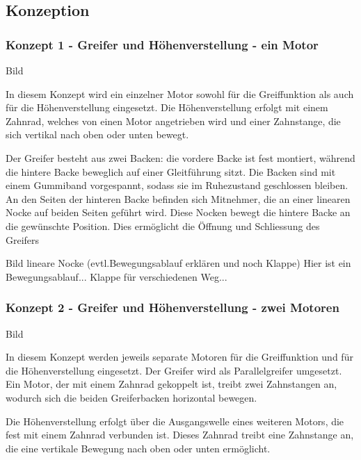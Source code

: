 \documentclass[main.tex]{subfiles} %
\begin{document}
\newpage

\subsection*{Konzeption}

\subsubsection*{Konzept 1 - Greifer und Höhenverstellung - ein Motor}

Bild \newline

In diesem Konzept wird ein einzelner Motor sowohl für die Greiffunktion als auch für die Höhenverstellung eingesetzt. 
Die Höhenverstellung erfolgt mit einem Zahnrad, welches von einen Motor angetrieben wird und einer Zahnstange, die
sich vertikal nach oben oder unten bewegt.

Der Greifer besteht aus zwei Backen: die vordere Backe ist fest montiert, während die hintere Backe beweglich 
auf einer Gleitführung sitzt. Die Backen sind mit einem Gummiband vorgespannt, sodass sie im Ruhezustand 
geschlossen bleiben. An den Seiten der hinteren Backe befinden sich Mitnehmer, die an einer linearen Nocke 
auf beiden Seiten geführt wird. Diese Nocken bewegt die hintere Backe an die gewünschte Position.
Dies ermöglicht die Öffnung und Schliessung des Greifers \newline


Bild lineare Nocke (evtl.Bewegungsablauf erklären und noch Klappe) \newline
Hier ist ein Bewegungsablauf... Klappe für verschiedenen Weg...


\subsubsection*{Konzept 2 - Greifer und Höhenverstellung - zwei Motoren}

Bild \newline

In diesem Konzept werden jeweils separate Motoren für die Greiffunktion und für die Höhenverstellung eingesetzt. 
Der Greifer wird als Parallelgreifer umgesetzt. Ein Motor, der mit einem Zahnrad gekoppelt ist, treibt zwei 
Zahnstangen an, wodurch sich die beiden Greiferbacken horizontal bewegen.

Die Höhenverstellung erfolgt über die Ausgangswelle eines weiteren Motors, die fest mit einem Zahnrad verbunden ist.
Dieses Zahnrad treibt eine Zahnstange an, die eine vertikale Bewegung nach oben oder unten ermöglicht.
\end{document}

